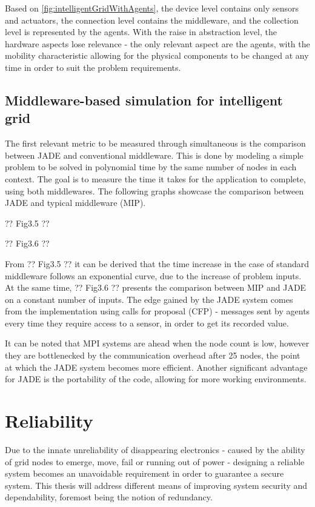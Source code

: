 Based on \cref{fig:intelligentGridWithAgents}, the device level contains only sensors and actuators, the connection level contains the middleware,
and the collection level is represented by the agents. With the raise in abstraction level, the hardware aspects lose relevance - the only
relevant aspect are the agents, with the mobility characteristic allowing for the physical components to be changed at any time in order
to suit the problem requirements.

\subsection{Middleware-based simulation for intelligent grid}

The first relevant metric to be measured through simultaneous is the comparison between JADE and conventional middleware. This is done by 
modeling a simple problem to be solved in polynomial time by the same number of nodes in each context. The goal is to measure the time
it takes for the application to complete, using both middlewares. The following graphs showcase the comparison between JADE and typical
middleware (MIP).

?? Fig3.5 ??

?? Fig3.6 ??

From ?? Fig3.5 ?? it can be derived that the time increase in the case of standard middleware follows an exponential curve, due to the 
increase of problem inputs. At the same time, ?? Fig3.6 ?? presents the comparison between MIP and JADE on a constant number of inputs.
The edge gained by the JADE system comes from the implementation using calls for proposal (CFP) - messages sent by agents every time they
require access to a sensor, in order to get its recorded value.

It can be noted that MPI systems are ahead when the node count is low, however they are bottlenecked by the communication overhead after
25 nodes, the point at which the JADE system becomes more efficient. Another significant advantage for JADE is the portability of the code,
allowing for more working environments.

\section{Reliability}

Due to the innate unreliability of disappearing electronics - caused by the ability of grid nodes to emerge, move, fail or running out of
power - designing a reliable system becomes an unavoidable requirement in order to guarantee a secure system. This thesis will address different
means of improving system security and dependability, foremost being the notion of redundancy.

